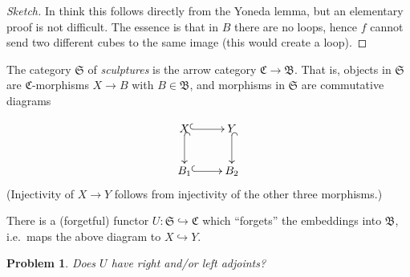 \documentclass[submission,copyright,creativecommons]{eptcs}
\newcommand\cat[1]{\mathfrak{#1}}
\newcommand\Cub{\cat{C}}
\newcommand\Bulk{\cat{B}}
\newcommand\Scul{\cat{S}}
\newtheorem{problem}{Problem}
\begin{document}
	\begin{proof}[Sketch]
  		In think this follows directly from the Yoneda lemma, but an elementary proof is not difficult. The essence is that in $B$ there are no loops, hence $f$ cannot send two different cubes to the same image (this would create a loop).
	\end{proof}

	The category $\Scul$ of \emph{sculptures} is the arrow category $\Cub\to \Bulk$. That is, objects in $\Scul$ are $\Cub$-morphisms $X\to B$ with $B\in \Bulk$, and morphisms in $\Scul$ are commutative diagrams
	
	\begin{equation*}
		\xymatrix{X \ar@{^(->}[r] \ar@{^(->}[d] & Y \ar@{^(->}[d] \\ B_1\ar@{^(->}[r] & B_2}
	\end{equation*}
	(Injectivity of $X\to Y$ follows from injectivity of the other three morphisms.)

	There is a (forgetful) functor $U: \Scul\hookrightarrow \Cub$ which ``forgets'' the embeddings into $\Bulk$, i.e.~maps the above diagram to $X\hookrightarrow Y$.

	\begin{problem}
  		Does $U$ have right and/or left adjoints?
	\end{problem}



	


\end{document}
